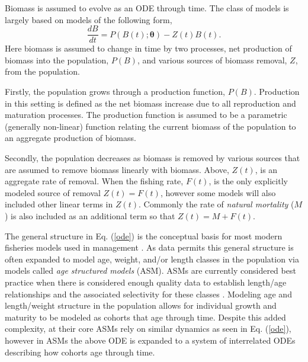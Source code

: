 \documentclass[12pt]{ucscthesis}
\begin{document}
% 
Biomass is assumed to evolve as an ODE through time. 
The class of models is largely based on models of the following form,
%
\begin{equation}
\frac{dB}{dt} = P(B(t); \bm{\theta}) - Z(t)B(t). \label{ode}
\end{equation}
Here biomass is assumed to change in time by two processes, net production of
biomass into the population, $P(B)$, and various sources of biomass removal, 
$Z$, from the population.

Firstly, the population grows through a production function, $P(B)$. Production
in this setting is defined as the net biomass increase due to all reproduction
and maturation processes.
The production function is assumed to be a parametric (generally non-linear) 
function relating the current biomass of the population to an aggregate 
production of biomass.

%
Secondly, the population decreases as biomass is removed by various sources 
that are assumed to remove biomass linearly with biomass. Above, $Z(t)$, is 
an aggregate rate of removal. When the fishing rate, $F(t)$, is the only 
explicitly modeled source of removal $Z(t)=F(t)$, however some models will 
also included other linear terms in $Z(t)$. Commonly the rate of {\it natural 
mortality} ($M$) is also included as an additional term so that $Z(t)=M+F(t)$.

%

%
The general structure in Eq. (\ref{ode}) is the conceptual basis for most 
modern fisheries models used in management \cite{hilborn_quantitative_1992, methot_stock_2013, winker_jabba_2018}. 
As data permits this general structure is often expanded to model age, weight, 
and/or length classes \cite{schnute_general_1987, fournier_length-based_1987} 
in the population via models called {\it age structured models} (ASM). ASMs 
are currently considered best practice when there is %
considered enough quality data to establish length/age relationships and the 
associated selectivity for these classes \cite{maunder_review_2013, cope_stock_2023}. 
Modeling age and length/weight structure in the population allows for 
individual growth and maturity to be modeled as cohorts that age through time. 
Despite this added complexity, at their core ASMs rely on similar dynamics as 
seen in Eq. (\ref{ode}), however in ASMs the above ODE is expanded to a system 
of interrelated ODEs describing how cohorts age through time. %
\end{document}
